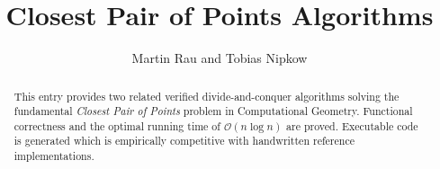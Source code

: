 \documentclass[11pt,a4paper]{article}
\begin{document}
\title{Closest Pair of Points Algorithms}
\author{Martin Rau and Tobias Nipkow}
\maketitle

\begin{abstract}
This entry provides two related verified divide-and-conquer algorithms solving
the fundamental \textit{Closest Pair of Points} problem in Computational Geometry.
Functional correctness and the optimal running time of $\mathcal{O}(n \log n)$ are proved. 
Executable code is generated which is empirically competitive with handwritten
reference implementations.
\end{abstract}

\tableofcontents
\newpage





\end{document}
